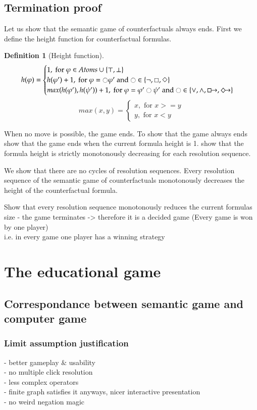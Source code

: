 \documentclass[a4paper,american]{paper}
\theoremstyle{definition}\newtheorem{definition}{Definition}
\begin{document}
\subsection{Termination proof}
Let us show that the semantic game of counterfactuals always ends. First we define the height function for counterfactual formulas.
\begin{definition}[Height function]
\[h(\varphi) = 
\begin{cases}
1,\text{ for }\varphi\in Atoms\cup\{\top ,\bot\}\\
h(\varphi') + 1,\text{ for }\varphi=\ocircle\varphi'\text{ and }\ocircle\in\{\neg ,\Box ,\Diamond\}\\
max(h(\varphi'),h(\psi')) + 1,\text{ for }\varphi=\varphi'\ocircle\psi'\text{ and }\ocircle\in\{\vee ,\wedge ,\boxright ,\Diamondright\}
\end{cases}\]
\[max(x, y) =
\begin{cases}
x,\text{ for }x>=y\\
y,\text{ for }x<y
\end{cases}\]
\end{definition}




When no move is possible, the game ends. 
To show that the game always ends 
show that the game ends when the current formula height is 1.
show that the formula height is strictly monotonously decreasing for each resolution sequence.


We show that there are no cycles of resolution sequences. Every resolution sequence of the semantic game of counterfactuals monotonously decreases the height of the counterfactual formula.








Show that every resolution sequence monotonously reduces the current formulas size
- 
the game terminates -> therefore it is a decided game (Every game is won by one player)\\
i.e. in every game one player has a winning strategy
\section{The educational game}
\subsection{Correspondance between semantic game and computer game}
\subsubsection{Limit assumption justification}
- better gameplay $\&$ usability\\
- no multiple click resolution\\
- less complex operators\\
- finite graph satisfies it anyways, nicer interactive presentation\\
- no weird negation magic
\end{document}
